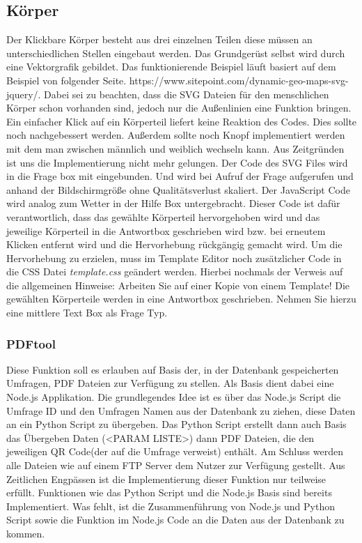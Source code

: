 \subsection{Körper}
Der Klickbare Körper besteht aus drei einzelnen Teilen diese müssen an unterschiedlichen Stellen eingebaut werden. Das Grundgerüst selbst wird durch eine Vektorgrafik gebildet. Das funktionierende Beispiel läuft basiert auf dem Beispiel von folgender Seite. https://www.sitepoint.com/dynamic-geo-maps-svg-jquery/. Dabei sei zu beachten, dass die SVG Dateien für den menschlichen Körper schon vorhanden sind, jedoch nur die Außenlinien eine Funktion bringen. Ein einfacher Klick auf ein Körperteil liefert keine Reaktion des Codes. Dies sollte noch nachgebessert werden. Außerdem sollte noch Knopf implementiert werden mit dem man zwischen männlich und weiblich wechseln kann. Aus Zeitgründen ist uns die Implementierung nicht mehr gelungen. Der Code des SVG Files wird in die Frage box mit eingebunden. Und wird bei Aufruf der Frage aufgerufen und anhand der Bildschirmgröße ohne Qualitätsverlust skaliert. Der JavaScript Code wird analog zum Wetter in der Hilfe Box untergebracht. Dieser Code ist dafür verantwortlich, dass das gewählte Körperteil hervorgehoben wird und das jeweilige Körperteil in die Antwortbox geschrieben wird bzw. bei erneutem Klicken entfernt wird und die Hervorhebung rückgängig gemacht wird. Um die Hervorhebung zu erzielen, muss im Template Editor noch zusätzlicher Code in die CSS Datei \textit{template.css} geändert werden. Hierbei nochmals der Verweis auf die allgemeinen Hinweise: Arbeiten Sie auf einer Kopie von einem Template! Die gewählten Körperteile werden in eine Antwortbox geschrieben. Nehmen Sie hierzu eine mittlere Text Box als Frage Typ.
\subsubsection{PDFtool}
Diese Funktion soll es erlauben auf Basis der, in der Datenbank gespeicherten Umfragen, PDF Dateien zur Verfügung zu stellen. Als Basis dient dabei eine Node.js Applikation.
Die grundlegendes Idee ist es über das Node.js Script die Umfrage ID und den Umfragen Namen aus der Datenbank zu ziehen, diese Daten an ein Python Script zu übergeben.
Das Python Script erstellt dann auch Basis das Übergeben Daten (<PARAM LISTE>) dann PDF Dateien, die den jeweiligen QR Code(der auf die Umfrage verweist) enthält.
Am Schluss werden alle Dateien wie auf einem FTP Server dem Nutzer zur Verfügung gestellt.
Aus Zeitlichen Engpässen ist die Implementierung dieser Funktion nur teilweise erfüllt. Funktionen wie das Python Script und die Node.js Basis sind bereits Implementiert. Was fehlt, ist die Zusammenführung von Node.js und Python Script sowie die Funktion im Node.js Code an die Daten aus der Datenbank zu kommen.

